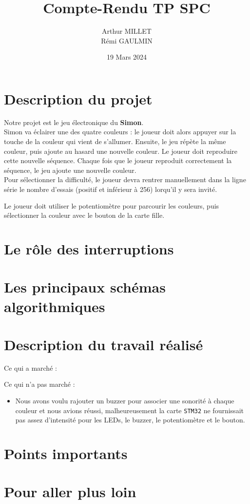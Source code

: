 \documentclass[10pt,a4,french]{article}
\title{Compte-Rendu TP SPC}
\author{Arthur MILLET\\ Rémi GAULMIN}
\date{19 Mars 2024}
\begin{document}
\lstset{language=C, frame=single}

\maketitle

\section{Description du projet}

Notre projet est le jeu électronique du \textbf{Simon}.
\\

Simon va éclairer une des quatre couleurs :
le joueur doit alors appuyer sur la touche de la couleur qui vient de s'allumer.
Ensuite, le jeu répète la même couleur, puis ajoute au hasard une nouvelle couleur.
Le joueur doit reproduire cette nouvelle séquence.
Chaque fois que le joueur reproduit correctement la séquence, le jeu ajoute une nouvelle couleur.
\\

Pour sélectionner la difficulté, le joueur devra rentrer manuellement dans la ligne série le nombre d'essais (positif et inférieur à 256) lorqu'il y sera invité.

Le joueur doit utiliser le potentiomètre pour parcourir les couleurs,
puis sélectionner la couleur avec le bouton de la carte fille.

\section{Le rôle des interruptions}

\section{Les principaux schémas algorithmiques}

\section{Description du travail réalisé}

Ce qui a marché :

\begin{itemize}
\end{itemize}

Ce qui n'a pas marché :

\begin{itemize}
	\item Nous avons voulu rajouter un buzzer pour associer une sonorité à chaque couleur et nous avions réussi,
		malheureusement la carte \texttt{STM32} ne fournissait pas assez d'intensité pour les LEDs, le buzzer, le potentiomètre et le bouton.
\end{itemize}

\section{Points importants}

\section{Pour aller plus loin}
\end{document}
